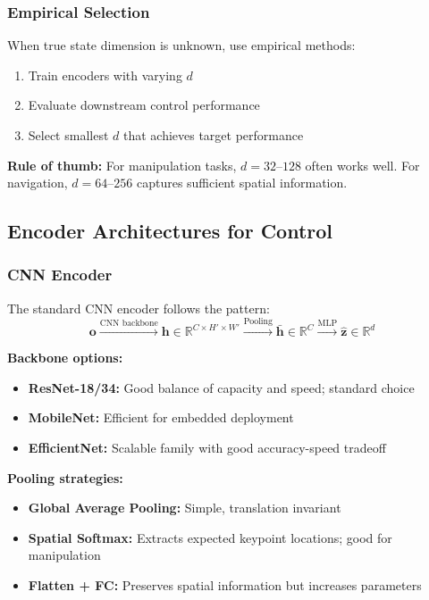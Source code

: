 \subsubsection{Empirical Selection}

When true state dimension is unknown, use empirical methods:
\begin{enumerate}
    \item Train encoders with varying $d$
    \item Evaluate downstream control performance
    \item Select smallest $d$ that achieves target performance
\end{enumerate}

\textbf{Rule of thumb:} For manipulation tasks, $d = 32$--$128$ often works well. For navigation, $d = 64$--$256$ captures sufficient spatial information.

\subsection{Encoder Architectures for Control}

\subsubsection{CNN Encoder}

The standard CNN encoder follows the pattern:
\begin{equation}
\mathbf{o} \xrightarrow{\text{CNN backbone}} \mathbf{h} \in \mathbb{R}^{C \times H' \times W'} \xrightarrow{\text{Pooling}} \bar{\mathbf{h}} \in \mathbb{R}^C \xrightarrow{\text{MLP}} \hat{\mathbf{z}} \in \mathbb{R}^d
\label{eq:cnn_encoder}
\end{equation}

\textbf{Backbone options:}
\begin{itemize}
    \item \textbf{ResNet-18/34:} Good balance of capacity and speed; standard choice
    \item \textbf{MobileNet:} Efficient for embedded deployment
    \item \textbf{EfficientNet:} Scalable family with good accuracy-speed tradeoff
\end{itemize}

\textbf{Pooling strategies:}
\begin{itemize}
    \item \textbf{Global Average Pooling:} Simple, translation invariant
    \item \textbf{Spatial Softmax:} Extracts expected keypoint locations; good for manipulation
    \item \textbf{Flatten + FC:} Preserves spatial information but increases parameters
\end{itemize}

